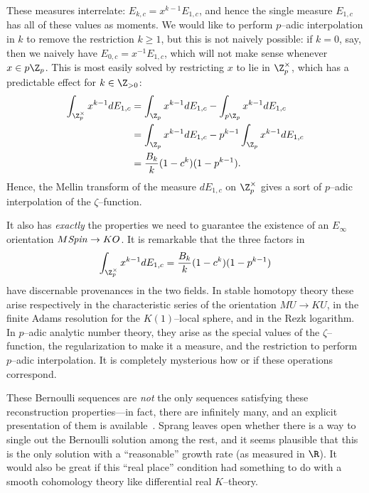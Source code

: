 These measures interrelate: $E_{k, c} = x^{k-1} E_{1, c}$, and hence the single measure $E_{1, c}$ has all of these values as moments.  We would like to perform $p$--adic interpolation in $k$ to remove the restriction $k \ge 1$, but this is not naively possible: if $k = 0$, say, then we naively have $E_{0, c} = x^{-1} E_{1, c}$, which will not make sense whenever $x \in p\Z_p$.  This is most easily solved by restricting $x$ to lie in $\Z_p^\times$, which has a predictable effect for $k \in \Z_{> 0}$:
\begin{align*}
\int_{\Z_p^\times} x^{k-1} dE_{1,c} & = \int_{\Z_p} x^{k-1} dE_{1,c} - \int_{p\Z_p} x^{k-1} dE_{1, c} \\
& = \int_{\Z_p} x^{k-1} dE_{1,c} - p^{k-1} \int_{\Z_p} x^{k-1} dE_{1, c} \\
& = \frac{B_k}{k}(1 - c^k)(1 - p^{k-1}).
\end{align*}
Hence, the Mellin transform of the measure $dE_{1,c}$ on $\Z_p^\times$ gives a sort of $p$--adic interpolation of the $\zeta$--function.

It also has \emph{exactly} the properties we need to guarantee the existence of an $E_\infty$ orientation $M\mathit{Spin} \to KO$.  It is remarkable that the three factors in \[\int_{\Z_p^\times} x^{k-1} d E_{1, c} = \frac{B_k}{k} (1 - c^k)(1 - p^{k-1})\] have discernable provenances in the two fields.  In stable homotopy theory these arise respectively in the characteristic series of the orientation $MU \to KU$, in the finite Adams resolution for the $K(1)$--local sphere, and in the Rezk logarithm.  In $p$--adic analytic number theory, they arise as the special values of the $\zeta$--function, the regularization to make it a measure, and the restriction to perform $p$--adic interpolation.  It is completely mysterious how or if these operations correspond.

\begin{remark}
These Bernoulli sequences are \emph{not} the only sequences satisfying these reconstruction properties---in fact, there are infinitely many, and an explicit presentation of them is available~\cite{SprangNaumann}.  Sprang leaves open whether there is a way to single out the Bernoulli solution among the rest, and it seems plausible that this is the only solution with a ``reasonable'' growth rate (as measured in $\R$).  It would also be great if this ``real place'' condition had something to do with a smooth cohomology theory like differential real $K$--theory.
\end{remark}


